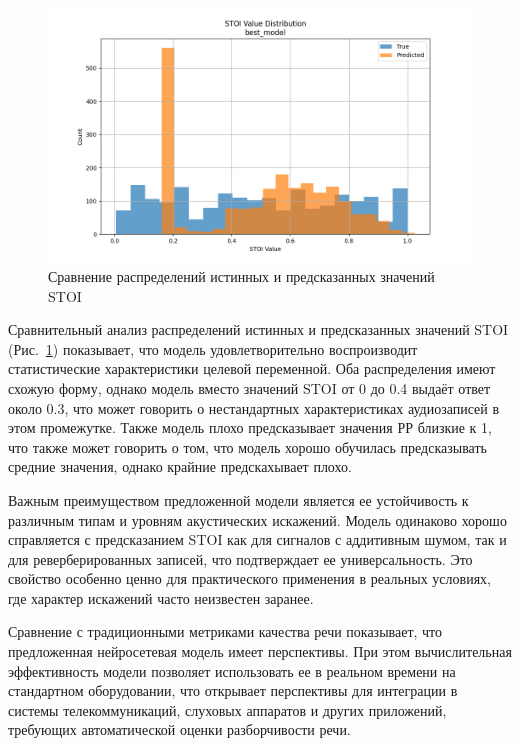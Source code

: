 \documentclass[oneside, final, 14pt]{extarticle}
\begin{document}
\begin{figure}[]
\centering
\includegraphics[width=1\linewidth]{best_model_stoi_dist.png}
\caption{Сравнение распределений истинных и предсказанных значений STOI}
\label{fig:stoi_dist_baseline}
\end{figure}

Сравнительный анализ распределений истинных и предсказанных значений STOI (Рис.~\ref{fig:stoi_dist_baseline}) показывает, что модель удовлетворительно воспроизводит статистические характеристики целевой переменной. Оба распределения имеют схожую форму, однако модель вместо значений STOI от 0 до 0.4 выдаёт ответ около 0.3, что может говорить о нестандартных характеристиках аудиозаписей в этом промежутке. Также модель плохо предсказывает значения РР близкие к 1, что также может говорить о том, что модель хорошо обучилась предсказывать средние значения, однако крайние предскахывает плохо.

Важным преимуществом предложенной модели является ее устойчивость к различным типам и уровням акустических искажений. Модель одинаково хорошо справляется с предсказанием STOI как для сигналов с аддитивным шумом, так и для реверберированных записей, что подтверждает ее универсальность. Это свойство особенно ценно для практического применения в реальных условиях, где характер искажений часто неизвестен заранее.

Сравнение с традиционными метриками качества речи показывает, что предложенная нейросетевая модель имеет перспективы. При этом вычислительная эффективность модели позволяет использовать ее в реальном времени на стандартном оборудовании, что открывает перспективы для интеграции в системы телекоммуникаций, слуховых аппаратов и других приложений, требующих автоматической оценки разборчивости речи.


\newpage
\printbibliography[heading=bibintoc, title={Список литературы}]
\end{document}
